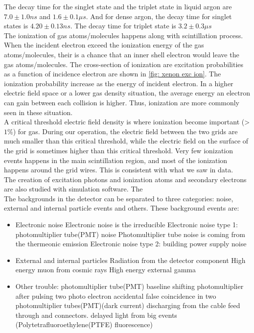 The decay time for the singlet state and the triplet state in liquid argon are $7.0 \pm 1.0 ns$ and $1.6 \pm 0.1 \mu s$. And for dense argon, the decay time for singlet states is $4.20 \pm 0.13 ns$. The decay time for triplet state is $3.2 \pm 0.3 \mu s$\\ 
The ionization of gas atoms/molecules happens along with scintillation process. When the incident electron exceed the ionization energy of the gas atoms/molecules, their is a chance that an inner shell electron would leave the gas atoms/molecules. The cross-section of ionization are excitation probabilities as a function of incidence electron are shown in \ref{fig: xenon exc ion}. The ionization probability increase as the energy of incident electron. In a higher electric field space or a lower gas density situation, the average energy an electron can gain between each collision is higher. Thus, ionization are more commonly seen in these situation. \\
A critical threshold electric field density is where ionization become important (>$1\%$) for gas. During our operation, the electric field between the two grids are much smaller than this critical threshold, while the electric field on the surface of the grid is sometimes higher than this critical threshold. Very few ionization events happens in the main scintillation region, and most of the ionization happens around the grid wires. This is consistent with what we saw in data.\\
The creation of excitation photons and ionization atoms and secondary electrons are also studied with simulation software. The    
\\
The backgrounds in the detector can be separated to three categories: noise, external and internal particle events and others. These background events are:\\
\begin{itemize}
\item Electronic noise
	Electronic noise is the irreducible
	\subitem Electronic noise type 1: photomultiplier tube(PMT) noise
    Photomultiplier tube noise is coming from the thermeonic emission  
    \subitem Electronic noise type 2: building power supply noise
\item External and internal particles	 
	\subitem Radiation from the detector component
	\subitem High energy muon from cosmic rays
	\subitem High energy external gamma 
\item Other trouble:
	\subitem photomultiplier tube(PMT) baseline shifting
    \subitem photomultiplier after pulsing
    \subitem two photo electron accidental false coincidence in two photomultiplier tubes(PMT)(dark current)
    \subitem discharging from the cable feed through and connectors.
    \subitem delayed light from big events (Polytetrafluoroethylene(PTFE) fluorescence)
\end{itemize}


